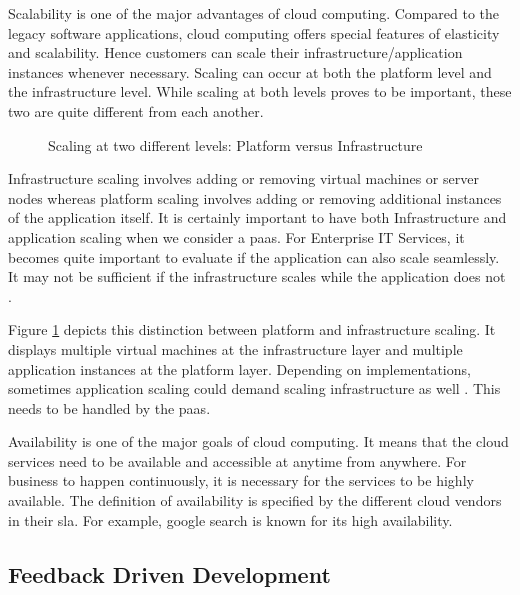 \documentclass[article,type=msc,colorback,12pt,accentcolor=tud8b,table]{tudthesis}
\begin{document}
		Scalability is one of the major advantages of cloud computing. Compared to the legacy software applications, cloud computing offers special features of elasticity and scalability. Hence customers can scale their infrastructure/application instances whenever necessary. Scaling can occur at both the platform level and the infrastructure level. While scaling at both levels proves to be important, these two are quite different from each another. 
		
		\begin{figure}[!h]
			\begin{center}
				\makebox[\textwidth]{\texttt{[image: 2-2]}}
			\end{center}
			\caption{Scaling at two different levels: Platform versus Infrastructure}
			\label{fig:scaling_infra_platform}
		\end{figure}
		
		Infrastructure scaling involves adding or removing virtual machines or server nodes whereas platform scaling involves adding or removing additional instances of the application itself. It is certainly important to have both Infrastructure and application scaling when we consider a \gls{paas}. For Enterprise IT Services, it becomes quite important to evaluate if the application can also scale seamlessly. It may not be sufficient if the infrastructure scales while the application does not \cite{app_infra_scale}. 
		
		Figure \ref{fig:scaling_infra_platform} depicts this distinction between platform and infrastructure scaling. It displays multiple virtual machines at the infrastructure layer and multiple application instances at the platform layer. Depending on implementations, sometimes application scaling could demand scaling infrastructure as well \cite{cf_scale}. This needs to be handled by the \gls{paas}. 
		
		\par Availability is one of the major goals of cloud computing. It means that the cloud services need to be available and accessible at anytime from anywhere. For business to happen continuously, it is necessary for the services to be highly available. The definition of availability is specified by the different cloud vendors in their \gls{sla}. For example, google search is known for its high availability.	
		
		\subsection{Feedback Driven Development } 		
		
\end{document}
